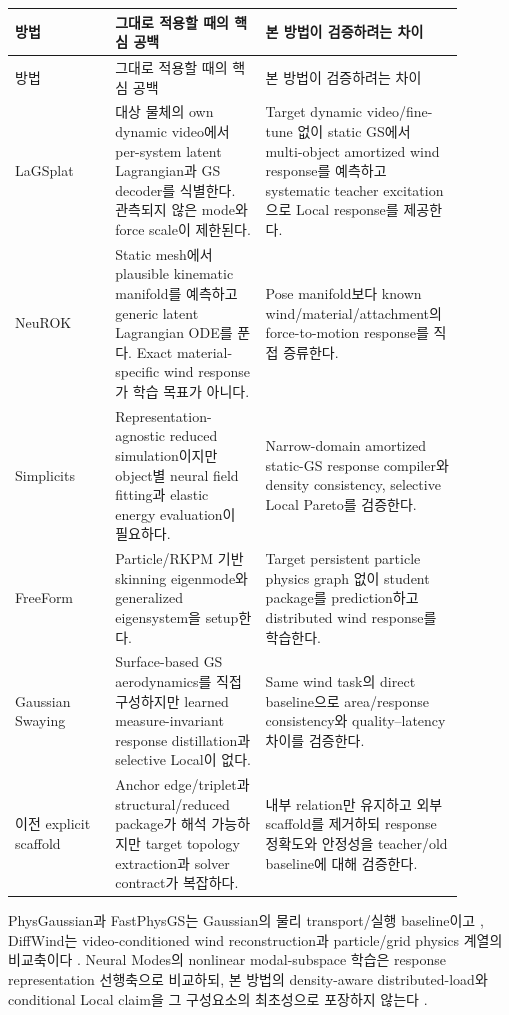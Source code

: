 \documentclass[11pt]{article}
\begin{document}
\begin{longtable}{L{0.20\linewidth}L{0.30\linewidth}L{0.39\linewidth}}
\toprule
방법 & 그대로 적용할 때의 핵심 공백 & 본 방법이 검증하려는 차이\\
\midrule
\endfirsthead
\toprule
방법 & 그대로 적용할 때의 핵심 공백 & 본 방법이 검증하려는 차이\\
\midrule
\endhead
LaGSplat \cite{pottier2026lagsplat} & 대상 물체의 own dynamic video에서 per-system latent Lagrangian과 GS decoder를 식별한다. 관측되지 않은 mode와 force scale이 제한된다. & Target dynamic video/fine-tune 없이 static GS에서 multi-object amortized wind response를 예측하고 systematic teacher excitation으로 Local response를 제공한다.\\
NeuROK \cite{geng2026neurok} & Static mesh에서 plausible kinematic manifold를 예측하고 generic latent Lagrangian ODE를 푼다. Exact material-specific wind response가 학습 목표가 아니다. & Pose manifold보다 known wind/material/attachment의 force-to-motion response를 직접 증류한다.\\
Simplicits \cite{modi2024simplicits} & Representation-agnostic reduced simulation이지만 object별 neural field fitting과 elastic energy evaluation이 필요하다. & Narrow-domain amortized static-GS response compiler와 density consistency, selective Local Pareto를 검증한다.\\
FreeForm \cite{xiang2026freeform} & Particle/RKPM 기반 skinning eigenmode와 generalized eigensystem을 setup한다. & Target persistent particle physics graph 없이 student package를 prediction하고 distributed wind response를 학습한다.\\
Gaussian Swaying \cite{yan2026gaussianswaying} & Surface-based GS aerodynamics를 직접 구성하지만 learned measure-invariant response distillation과 selective Local이 없다. & Same wind task의 direct baseline으로 area/response consistency와 quality--latency 차이를 검증한다.\\
이전 explicit scaffold & Anchor edge/triplet과 structural/reduced package가 해석 가능하지만 target topology extraction과 solver contract가 복잡하다. & 내부 relation만 유지하고 외부 scaffold를 제거하되 response 정확도와 안정성을 teacher/old baseline에 대해 검증한다.\\
\bottomrule
\end{longtable}

PhysGaussian과 FastPhysGS는 Gaussian의 물리 transport/실행 baseline이고
\cite{xie2024physgaussian,ma2026fastphysgs}, DiffWind는 video-conditioned wind reconstruction과
particle/grid physics 계열의 비교축이다 \cite{lei2026diffwind}. Neural Modes의 nonlinear modal-subspace 학습은
response representation 선행축으로 비교하되, 본 방법의 density-aware distributed-load와 conditional Local claim을
그 구성요소의 최초성으로 포장하지 않는다 \cite{wang2024neuralmodes}.
\end{document}
